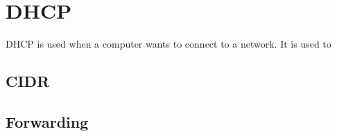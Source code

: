 \section{DHCP}
DHCP is used when a computer wants to connect to a network. It is used
to 

\subsection{CIDR}
\subsection{Forwarding}
